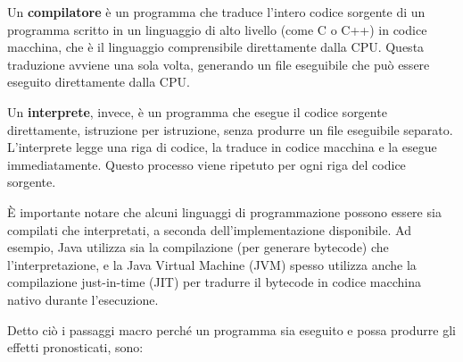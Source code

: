 \documentclass[
  letterpaper,
]{scrbook}
\begin{document}
Un \textbf{compilatore} è un programma che traduce l'intero codice
sorgente di un programma scritto in un linguaggio di alto livello (come
C o C++) in codice macchina, che è il linguaggio comprensibile
direttamente dalla CPU. Questa traduzione avviene una sola volta,
generando un file eseguibile che può essere eseguito direttamente dalla
CPU.

Un \textbf{interprete}, invece, è un programma che esegue il codice
sorgente direttamente, istruzione per istruzione, senza produrre un file
eseguibile separato. L'interprete legge una riga di codice, la traduce
in codice macchina e la esegue immediatamente. Questo processo viene
ripetuto per ogni riga del codice sorgente.

È importante notare che alcuni linguaggi di programmazione possono
essere sia compilati che interpretati, a seconda dell'implementazione
disponibile. Ad esempio, Java utilizza sia la compilazione (per generare
bytecode) che l'interpretazione, e la Java Virtual Machine (JVM) spesso
utilizza anche la compilazione just-in-time (JIT) per tradurre il
bytecode in codice macchina nativo durante l'esecuzione.

Detto ciò i passaggi macro perché un programma sia eseguito e possa
produrre gli effetti pronosticati, sono:
\end{document}
